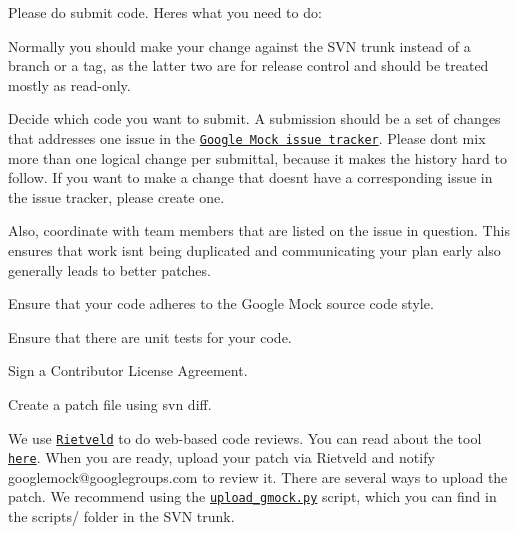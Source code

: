 Please do submit code. Here\textquotesingle{}s what you need to do\+:


\begin{DoxyEnumerate}
\item Normally you should make your change against the S\+VN trunk instead of a branch or a tag, as the latter two are for release control and should be treated mostly as read-\/only.
\end{DoxyEnumerate}
\begin{DoxyEnumerate}
\item Decide which code you want to submit. A submission should be a set of changes that addresses one issue in the \href{http://code.google.com/p/googlemock/issues/list}{\tt Google Mock issue tracker}. Please don\textquotesingle{}t mix more than one logical change per submittal, because it makes the history hard to follow. If you want to make a change that doesn\textquotesingle{}t have a corresponding issue in the issue tracker, please create one.
\end{DoxyEnumerate}
\begin{DoxyEnumerate}
\item Also, coordinate with team members that are listed on the issue in question. This ensures that work isn\textquotesingle{}t being duplicated and communicating your plan early also generally leads to better patches.
\end{DoxyEnumerate}
\begin{DoxyEnumerate}
\item Ensure that your code adheres to the Google Mock source code style.
\end{DoxyEnumerate}
\begin{DoxyEnumerate}
\item Ensure that there are unit tests for your code.
\end{DoxyEnumerate}
\begin{DoxyEnumerate}
\item Sign a Contributor License Agreement.
\end{DoxyEnumerate}
\begin{DoxyEnumerate}
\item Create a patch file using {\ttfamily svn diff}.
\end{DoxyEnumerate}
\begin{DoxyEnumerate}
\item We use \href{http://codereview.appspot.com/}{\tt Rietveld} to do web-\/based code reviews. You can read about the tool \href{https://github.com/rietveld-codereview/rietveld/wiki}{\tt here}. When you are ready, upload your patch via Rietveld and notify {\ttfamily googlemock@googlegroups.\+com} to review it. There are several ways to upload the patch. We recommend using the \href{../scripts/upload_gmock.py}{\tt upload\+\_\+gmock.\+py} script, which you can find in the {\ttfamily scripts/} folder in the S\+VN trunk.
\end{DoxyEnumerate}

